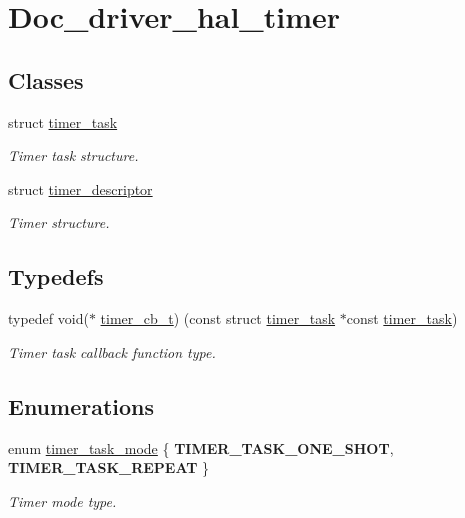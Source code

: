 \hypertarget{group__doc__driver__hal__timer}{}\section{Doc\+\_\+driver\+\_\+hal\+\_\+timer}
\label{group__doc__driver__hal__timer}
\subsection*{Classes}
\begin{DoxyCompactItemize}
\item 
struct \hyperlink{structtimer__task}{timer\+\_\+task}
\begin{DoxyCompactList}\small\item\em Timer task structure. \end{DoxyCompactList}\item 
struct \hyperlink{structtimer__descriptor}{timer\+\_\+descriptor}
\begin{DoxyCompactList}\small\item\em Timer structure. \end{DoxyCompactList}\end{DoxyCompactItemize}
\subsection*{Typedefs}
\begin{DoxyCompactItemize}
\item 
\mbox{\label{group__doc__driver__hal__timer_ga636b5fdfa1fc11dcedfc831f36bec204}} 
typedef void($\ast$ \hyperlink{group__doc__driver__hal__timer_ga636b5fdfa1fc11dcedfc831f36bec204}{timer\+\_\+cb\+\_\+t}) (const struct \hyperlink{structtimer__task}{timer\+\_\+task} $\ast$const \hyperlink{structtimer__task}{timer\+\_\+task})
\begin{DoxyCompactList}\small\item\em Timer task callback function type. \end{DoxyCompactList}\end{DoxyCompactItemize}
\subsection*{Enumerations}
\begin{DoxyCompactItemize}
\item 
\mbox{\label{group__doc__driver__hal__timer_gaca1571cb764dfc6dc97aca691789d53d}} 
enum \hyperlink{group__doc__driver__hal__timer_gaca1571cb764dfc6dc97aca691789d53d}{timer\+\_\+task\+\_\+mode} \{ {\bfseries T\+I\+M\+E\+R\+\_\+\+T\+A\+S\+K\+\_\+\+O\+N\+E\+\_\+\+S\+H\+OT}, 
{\bfseries T\+I\+M\+E\+R\+\_\+\+T\+A\+S\+K\+\_\+\+R\+E\+P\+E\+AT}
 \}\begin{DoxyCompactList}\small\item\em Timer mode type. \end{DoxyCompactList}
\end{DoxyCompactItemize}
